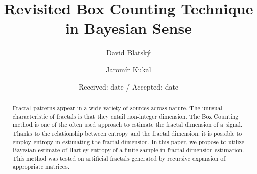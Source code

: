 \documentclass[smallextended]{svjour3}
\begin{document}
\title{Revisited Box Counting Technique in Bayesian Sense}
\subtitle{}


\author{David Blatsk\'{y}         \and
        Jarom\'{i}r Kukal
}



\date{Received: date / Accepted: date}


\maketitle

\begin{abstract}
Fractal patterns appear in a wide variety of sources across nature. The unusual characteristic of fractals is that they entail non-integer dimension. The Box Counting method is one of the often used approach to estimate the fractal dimension of a signal. Thanks to the relationship between entropy and the fractal dimension, it is possible to employ entropy in estimating the fractal dimension. In this paper, we propose to utilize Bayesian estimate of Hartley entropy of a finite sample in fractal dimension estimation. This method was tested on artificial fractals generated by recursive expansion of appropriate matrices.
\end{abstract}








\end{document}
